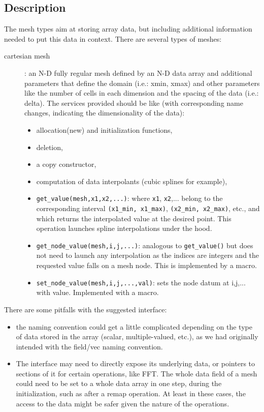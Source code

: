 \documentclass[]{report}   %
\begin{document}
\subsection{Description}
The mesh types aim at storing array data, but including additional information needed to put this data in context. There are several types of meshes:
\begin{description}
\item[cartesian mesh]: an N-D fully regular mesh defined by an N-D data array and additional parameters that define the domain (i.e.: xmin, xmax) and other parameters like the number of cells in each dimension and the spacing of the data (i.e.: delta). The services provided should be like (with corresponding name changes, indicating the dimensionality of the data):
\begin{itemize}
\item allocation(new) and initialization functions,
\item deletion,
\item a copy constructor,
\item computation of data interpolants (cubic splines for example),
\item \verb+get_value(mesh,x1,x2,...)+: where \verb+x1+, \verb+x2+,... belong to the corresponding interval \verb+(x1_min, x1_max)+, \verb+(x2_min, x2_max)+, etc., and which returns the interpolated value at the desired point. This operation launches spline interpolations under the hood.
\item \verb+get_node_value(mesh,i,j,...)+: analogous to \verb+get_value()+ but does not need to launch any interpolation as the indices are integers and the requested value falls on a mesh node. This is implemented by a macro.
\item \verb+set_node_value(mesh,i,j,...,val)+: sets the node datum at i,j,... with value. Implemented with a macro.
\end{itemize}
\end{description}
There are some pitfalls with the suggested interface:
\begin{itemize}
\item the naming convention could get a little complicated depending on the type of data stored in the array (scalar, multiple-valued, etc.), as we had originally intended with the field/vec naming convention.
\item The interface may need to directly expose its underlying data, or pointers to sections of it for certain operations, like FFT. The whole data field of a mesh could need to be set to a whole data array in one step, during the initialization, such as after a remap operation. At least in these cases, the access to the data might be safer given the nature of the operations.
\end{itemize}
\end{document}
